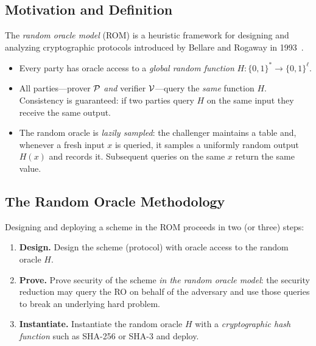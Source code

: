 \documentclass[11pt]{article}
\begin{document}
\subsection{Motivation and Definition}

The \emph{random oracle model} (ROM) is a heuristic framework for
designing and analyzing cryptographic protocols introduced by
Bellare and Rogaway in 1993~\cite{BellareRogaway93}.

\begin{tcolorbox}[colback=blue!5, colframe=blue!40!black,
                  title={The Random Oracle Model (Bellare--Rogaway '93)}]
\begin{itemize}
  \item Every party has oracle access to a \emph{global random function}
        $H : \{0,1\}^* \to \{0,1\}^\ell$.
  \item All parties---prover $\mathcal{P}$ \emph{and} verifier $\mathcal{V}$---query
        the \emph{same} function $H$.  Consistency is guaranteed: if two
        parties query $H$ on the same input they receive the same output.
  \item The random oracle is \emph{lazily sampled}: the challenger
        maintains a table and, whenever a fresh input $x$ is queried,
        it samples a uniformly random output $H(x)$ and records it.
        Subsequent queries on the same $x$ return the same value.
\end{itemize}
\end{tcolorbox}

\subsection{The Random Oracle Methodology}

Designing and deploying a scheme in the ROM proceeds in two (or
three) steps:

\begin{enumerate}
  \item \textbf{Design.} Design the scheme (protocol) with oracle access
        to the random oracle $H$.
  \item \textbf{Prove.} Prove security of the scheme \emph{in the random
        oracle model}: the security reduction may query the RO on behalf
        of the adversary and use those queries to break an underlying
        hard problem.
  \item \textbf{Instantiate.} Instantiate the random oracle $H$ with a
        \emph{cryptographic hash function} such as SHA-256 or SHA-3 and
        deploy.
\end{enumerate}
\end{document}
